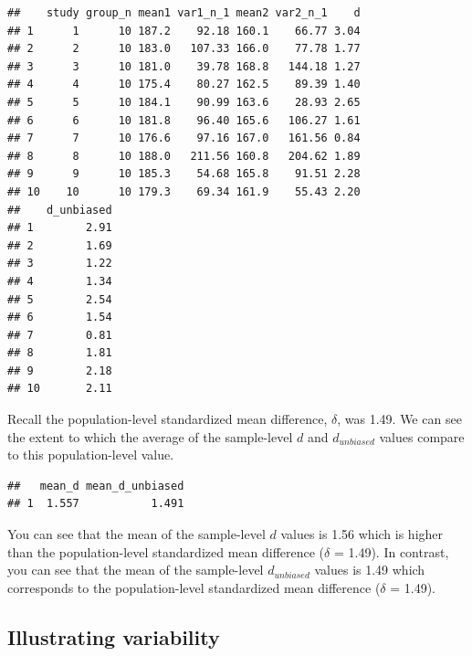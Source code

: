 \documentclass[
]{krantz}
\makeatletter
\newenvironment{Shaded}{\begin{snugshade}}{\end{snugshade}}
\newcommand{\DataTypeTok}[1]{\textcolor[rgb]{0.27,0.27,0.27}{#1}}
\newcommand{\KeywordTok}[1]{\textcolor[rgb]{0.27,0.27,0.27}{\textbf{#1}}}
\newcommand{\NormalTok}[1]{#1}
\newcommand{\OperatorTok}[1]{\textcolor[rgb]{0.43,0.43,0.43}{\textbf{#1}}}
\newcommand{\StringTok}[1]{\textcolor[rgb]{0.5,0.5,0.5}{#1}}
\newenvironment{kframe}{%
\medskip{}
\setlength{\fboxsep}{.8em}
 \def\at@end@of@kframe{}%
 \ifinner\ifhmode%
  \def\at@end@of@kframe{\end{minipage}}%
  \begin{minipage}{\columnwidth}%
 \fi\fi%
 \def\FrameCommand##1{\hskip\@totalleftmargin \hskip-\fboxsep
 \colorbox{shadecolor}{##1}\hskip-\fboxsep
     \hskip-\linewidth \hskip-\@totalleftmargin \hskip\columnwidth}%
 \MakeFramed {\advance\hsize-\width
   \@totalleftmargin\z@ \linewidth\hsize
   \@setminipage}}%
 {\par\unskip\endMakeFramed%
 \at@end@of@kframe}
\renewenvironment{Shaded}{\begin{kframe}}{\end{kframe}}
\makeatother
\begin{document}
\begin{verbatim}
##    study group_n mean1 var1_n_1 mean2 var2_n_1    d
## 1      1      10 187.2    92.18 160.1    66.77 3.04
## 2      2      10 183.0   107.33 166.0    77.78 1.77
## 3      3      10 181.0    39.78 168.8   144.18 1.27
## 4      4      10 175.4    80.27 162.5    89.39 1.40
## 5      5      10 184.1    90.99 163.6    28.93 2.65
## 6      6      10 181.8    96.40 165.6   106.27 1.61
## 7      7      10 176.6    97.16 167.0   161.56 0.84
## 8      8      10 188.0   211.56 160.8   204.62 1.89
## 9      9      10 185.3    54.68 165.8    91.51 2.28
## 10    10      10 179.3    69.34 161.9    55.43 2.20
##    d_unbiased
## 1        2.91
## 2        1.69
## 3        1.22
## 4        1.34
## 5        2.54
## 6        1.54
## 7        0.81
## 8        1.81
## 9        2.18
## 10       2.11
\end{verbatim}

Recall the population-level standardized mean difference, \(\delta\), was 1.49. We can see the extent to which the average of the sample-level \(d\) and \(d_{unbiased}\) values compare to this population-level value.

\begin{Shaded}
\end{Shaded}

\begin{verbatim}
##   mean_d mean_d_unbiased
## 1  1.557           1.491
\end{verbatim}

You can see that the mean of the sample-level \(d\) values is 1.56 which is higher than the population-level standardized mean difference (\(\delta\) = 1.49). In contrast, you can see that the mean of the sample-level \(d_{unbiased}\) values is 1.49 which corresponds to the population-level standardized mean difference (\(\delta\) = 1.49).

\hypertarget{illustrating-variability}{%
\subsection{Illustrating variability}\label{illustrating-variability}}
\end{document}
